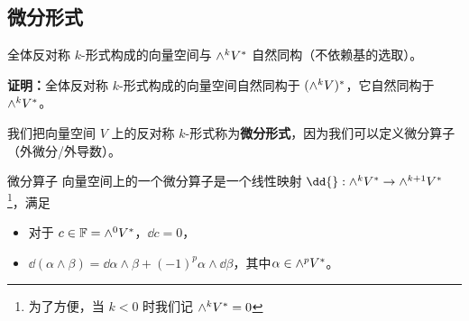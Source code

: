 

\subsection{微分形式}

\begin{theorem}{}
全体反对称 $k$-形式构成的向量空间与 ${\large \wedge}^k V^*$ 自然同构（不依赖基的选取）。
\end{theorem}
\textbf{证明：}全体反对称 $k$-形式构成的向量空间自然同构于 $({\large \wedge}^k V)^*$，它自然同构于 ${\large \wedge}^k V^*$。

我们把向量空间 $V$ 上的反对称 $k$-形式称为\textbf{微分形式}，因为我们可以定义微分算子（外微分/外导数）。

\begin{definition}{微分算子}
向量空间上的一个微分算子是一个线性映射 $\dd{} : {\large \wedge}^k V^* \to {\large \wedge}^{k + 1} V^*$\footnote{为了方便，当 $k < 0$ 时我们记 ${\large \wedge}^k V^* = 0$}，满足
\begin{itemize}
\item 对于 $c \in \mathbb{F} = {\large \wedge}^0 V^*$，$\dd c = 0$，
\item $\dd(\alpha \wedge \beta) = \dd\alpha \wedge \beta + (-1)^p \alpha \wedge \dd\beta$，其中$\alpha \in {\large \wedge}^p V^*$。
\end{itemize}


\end{definition}
